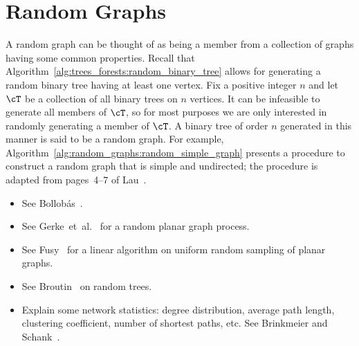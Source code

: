 
\chapter{Random Graphs}
\label{chap:random_graphs}

A random graph can be thought of as being a member
from a collection of graphs having some common properties. Recall that
Algorithm~\ref{alg:trees_forests:random_binary_tree} allows for
generating a random binary tree having at least one vertex. Fix a
positive integer $n$ and let $\cT$ be a collection of all binary trees
on $n$ vertices. It can be infeasible to generate all members of
$\cT$, so for most purposes we are only interested in randomly
generating a member of $\cT$. A binary tree of order $n$ generated in
this manner is said to be a random graph. For
example, Algorithm~\ref{alg:random_graphs:random_simple_graph}
presents a procedure to construct a random graph that is simple and
undirected; the procedure is adapted from pages~4--7 of
Lau~\cite{Lau2007}.

\begin{itemize}
\item See Bollob{\'a}s~\cite{Bollobas2001}.

\item See Gerke~et~al.~\cite{GerkeEtAl2008} for a random planar graph
  process.

\item See Fusy~\cite{Fusy2009} for a linear algorithm on uniform
  random sampling of planar graphs.

\item See Broutin~\cite{Broutin2007} on random trees.

\item Explain some network statistics: degree distribution, average
  path length, clustering coefficient, number of shortest paths,
  etc. See Brinkmeier and Schank~\cite{BrinkmeierSchank2005}.
\end{itemize}

